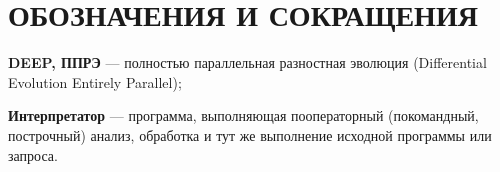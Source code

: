 \chapter*{ОБОЗНАЧЕНИЯ И СОКРАЩЕНИЯ}

\textbf{DEEP, ППРЭ} --- полностью параллельная разностная эволюция (Differential Evolution Entirely Parallel);

\textbf{Интерпретатор} --- программа, выполняющая пооператорный (покомандный, построчный) анализ, обработка и тут же выполнение исходной программы или запроса.


